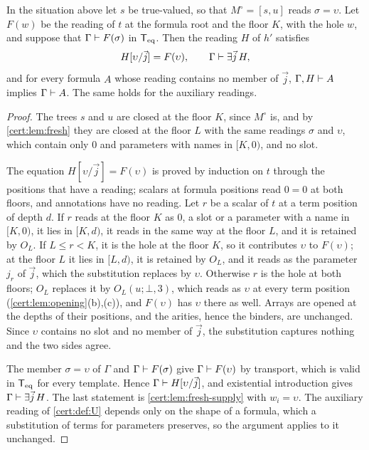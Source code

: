 \begin{proposition}\label{cert:prop:delayed-equality}
In the situation above let $s$ be true-valued, so that $M^{\circ}=[s,u]$
reads $\sigma=\upsilon$. Let $F(w)$ be the reading of $t$ at the formula root
and the floor $K$, with the hole $w$, and suppose that
$\Gamma\vdash F(\sigma)$ in $\mathsf{T}_{\mathrm{eq}}$. Then the reading $H$ of $h'$ satisfies
\[
H[\upsilon/\vec j]=F(\upsilon),\qquad \Gamma\vdash\exists\vec j\,H,
\]
and for every formula $A$ whose reading contains no member of $\vec j$,
$\Gamma,H\vdash A$ implies $\Gamma\vdash A$. The same holds for the
auxiliary readings.
\end{proposition}
\begin{proof}
The trees $s$ and $u$ are closed at the floor $K$, since $M^{\circ}$ is, and
by \cref{cert:lem:fresh} they are closed at the floor $L$ with the same
readings $\sigma$ and $\upsilon$, which contain only $0$ and parameters with
names in $[K,0)$, and no slot.

The equation $H[\upsilon/\vec j]=F(\upsilon)$ is proved by induction on $t$
through the positions that have a reading; scalars at formula positions read
$0=0$ at both floors, and annotations have no reading. Let $r$ be a scalar of
$t$ at a term position of depth $d$. If $r$ reads at the floor $K$ as $0$, a
slot or a parameter with a name in $[K,0)$, it lies in $[K,d)$, it reads in
the same way at the floor $L$, and it is retained by $O_L$. If $L\le r<K$, it
is the hole at the floor $K$, so it contributes $\upsilon$ to $F(\upsilon)$;
at the floor $L$ it lies in $[L,d)$, it is retained by $O_L$, and it reads as
the parameter $j_r$ of $\vec j$, which the substitution replaces by
$\upsilon$. Otherwise $r$ is the hole at both floors; $O_L$ replaces it by
$O_L(u;\bot,3)$, which reads as $\upsilon$ at every term position
(\cref{cert:lem:opening}(b),(c)), and $F(\upsilon)$ has $\upsilon$ there as
well. Arrays are opened at the depths of their positions, and the arities,
hence the binders, are unchanged. Since $\upsilon$ contains no slot and no
member of $\vec j$, the substitution captures nothing and the two sides agree.

The member $\sigma=\upsilon$ of $\Gamma$ and $\Gamma\vdash F(\sigma)$ give
$\Gamma\vdash F(\upsilon)$ by transport, which is valid in $\mathsf{T}_{\mathrm{eq}}$ for every
template. Hence $\Gamma\vdash H[\upsilon/\vec j]$, and existential
introduction gives $\Gamma\vdash\exists\vec j\,H$. The last statement is
\cref{cert:lem:fresh-supply} with $w_i=\upsilon$. The auxiliary reading of
\cref{cert:def:U} depends only on the shape of a formula, which a substitution
of terms for parameters preserves, so the argument applies to it unchanged.
\end{proof}

